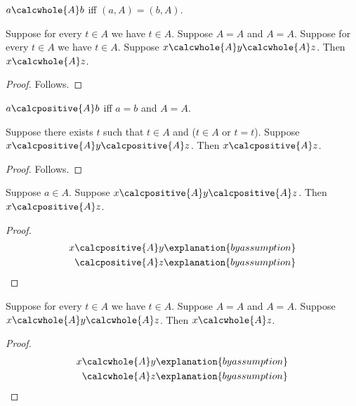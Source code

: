 \begin{abbreviation}\label{calculation_whole_relation}
    $a\calcwhole{A}b$ iff $(a,A)=(b,A)$.
\end{abbreviation}

\begin{composition}\label{calculation_whole_conditions}
    Suppose for every $t\in A$ we have $t\in A$.
    Suppose $A=A$ and $A=A$.
    Suppose for every $t\in A$ we have $t\in A$.
    Suppose $x\calcwhole{A}y\calcwhole{A}z$.
    Then $x\calcwhole{A}z$.
\end{composition}
\begin{proof}
    Follows.
\end{proof}

\begin{abbreviation}\label{calculation_positive_relation}
    $a\calcpositive{A}b$ iff $a=b$ and $A=A$.
\end{abbreviation}

\begin{composition}\label{calculation_positive_condition}
    Suppose there exists $t$ such that $t\in A$ and ($t\in A$ or $t=t$).
    Suppose $x\calcpositive{A}y\calcpositive{A}z$.
    Then $x\calcpositive{A}z$.
\end{composition}
\begin{proof}
    Follows.
\end{proof}

\begin{proposition}\label{calculation_positive_condition_consumer}
    Suppose $a\in A$.
    Suppose $x\calcpositive{A}y\calcpositive{A}z$.
    Then $x\calcpositive{A}z$.
\end{proposition}
\begin{proof}
    \begin{align*}
        x &\calcpositive{A}y \explanation{by assumption} \\
          &\calcpositive{A}z \explanation{by assumption}
    \end{align*}
\end{proof}

\begin{proposition}\label{calculation_whole_condition_consumer}
    Suppose for every $t\in A$ we have $t\in A$.
    Suppose $A=A$ and $A=A$.
    Suppose $x\calcwhole{A}y\calcwhole{A}z$.
    Then $x\calcwhole{A}z$.
\end{proposition}
\begin{proof}
    \begin{align*}
        x
            &\calcwhole{A} y
                \explanation{by assumption}
                \\
            &\calcwhole{A} z
                \explanation{by assumption}
    \end{align*}
\end{proof}

